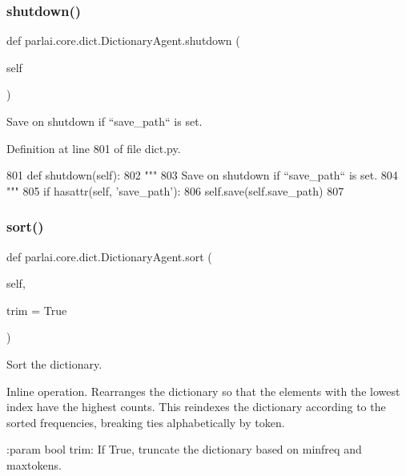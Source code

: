 \subsubsection{\texorpdfstring{shutdown()}{shutdown()}}
{\footnotesize\ttfamily def parlai.\+core.\+dict.\+Dictionary\+Agent.\+shutdown (\begin{DoxyParamCaption}\item[{}]{self }\end{DoxyParamCaption})}

\begin{DoxyVerb}Save on shutdown if ``save_path`` is set.
\end{DoxyVerb}
 

Definition at line 801 of file dict.\+py.


\begin{DoxyCode}
801     \textcolor{keyword}{def }shutdown(self):
802         \textcolor{stringliteral}{"""}
803 \textcolor{stringliteral}{        Save on shutdown if ``save\_path`` is set.}
804 \textcolor{stringliteral}{        """}
805         \textcolor{keywordflow}{if} hasattr(self, \textcolor{stringliteral}{'save\_path'}):
806             self.save(self.save\_path)
807 
\end{DoxyCode}
\mbox{\label{classparlai_1_1core_1_1dict_1_1DictionaryAgent_a84cb4fabf5d0e92e3f80ac16bdfd0ccc}} 
\subsubsection{\texorpdfstring{sort()}{sort()}}
{\footnotesize\ttfamily def parlai.\+core.\+dict.\+Dictionary\+Agent.\+sort (\begin{DoxyParamCaption}\item[{}]{self,  }\item[{}]{trim = {\ttfamily True} }\end{DoxyParamCaption})}

\begin{DoxyVerb}Sort the dictionary.

Inline operation. Rearranges the dictionary so that the elements with
the lowest index have the highest counts. This reindexes the dictionary
according to the sorted frequencies, breaking ties alphabetically by
token.

:param bool trim:
    If True, truncate the dictionary based on minfreq and maxtokens.
\end{DoxyVerb}
 

